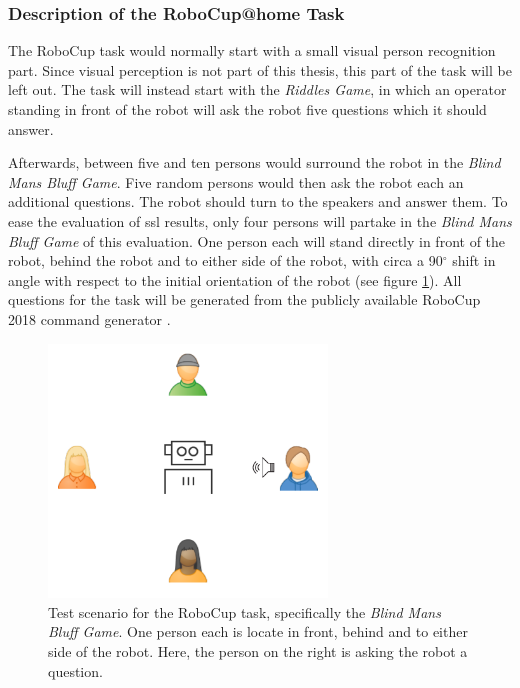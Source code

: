 \subsubsection{Description of the RoboCup@home Task}
The RoboCup task would normally start with a small visual person recognition part.
Since visual perception is not part of this thesis, this part of the task will be left out.
The task will instead start with the \textit{Riddles Game}, in which an operator standing in front of the robot will ask the robot five questions which it should answer.

Afterwards, between five and ten persons would surround the robot in the \textit{Blind Mans Bluff Game}.
Five random persons would then ask the robot each an additional questions.
The robot should turn to the speakers and answer them.
To ease the evaluation of \gls{ssl} results, only four persons will partake in the \textit{Blind Mans Bluff Game} of this evaluation.
One person each will stand directly in front of the robot, behind the robot and to either side of the robot, with circa a 90$^\circ$ shift in angle with respect to the initial orientation of the robot (see figure \ref{pic:eval_task}).
All questions for the task will be generated from the publicly available RoboCup 2018 command generator \cite{commandgen}.

\begin{figure}[]
	\centering
	\includegraphics[width=0.66\textwidth]{diagrams/robocup_task_t1.pdf}
	\caption{Test scenario for the RoboCup task, specifically the \textit{Blind Mans Bluff Game}. 
		One person each is locate in front, behind and to either side of the robot.
		Here, the person on the right is asking the robot a question.}
	\label{pic:eval_task}
\end{figure}


